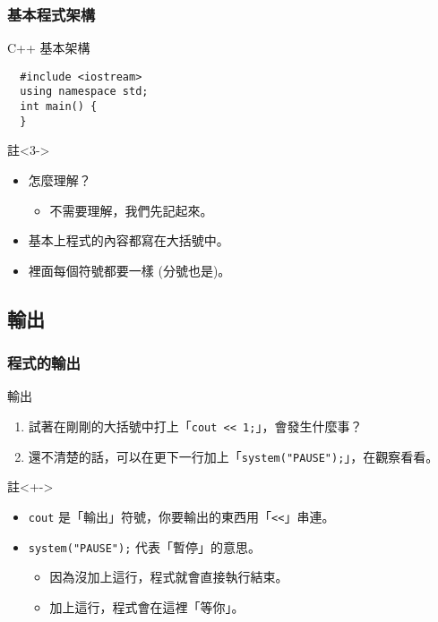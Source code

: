 \documentclass[utf8]{beamer}
\begin{document}
\begin{CJK}{UTF8}{bkai}
\begin{frame}[fragile]
  \frametitle{基本程式架構}
  \begin{block}{C++ 基本架構}
    \pause
    \begin{lstlisting}
  #include <iostream>
  using namespace std;
  int main() {
  }
    \end{lstlisting}
  \end{block}
  \begin{exampleblock}{註}<3->
    \begin{itemize}
    \item 怎麼理解？
      \begin{itemize}[<4->]
      \item 不需要理解，我們先記起來。
      \end{itemize}
    \item<5-> 基本上程式的內容都寫在\alert{大括號}中。
    \item<6-> 裡面每個符號都要一樣 (分號也是)。
    \end{itemize}
  \end{exampleblock}
\end{frame}

\subsection{輸出}

\begin{frame}[fragile]
  \frametitle{程式的輸出}
  \begin{block}{輸出}
    \begin{enumerate}[<+->]
      \item 試著在剛剛的大括號中打上「\lstinline{cout << 1;}」，會發生什麼事？
      \item 還不清楚的話，可以在更下一行加上「\lstinline{system("PAUSE");}」，在觀察看看。
    \end{enumerate}
  \end{block}
  \begin{exampleblock}{註}<+->
    \begin{itemize}
    \item \lstinline{cout} 是「輸出」符號，你要輸出的東西用「\lstinline{<<}」串連。
    \item<+-> \lstinline{system("PAUSE");} 代表「暫停」的意思。
      \begin{itemize}[<+->]
      \item 因為沒加上這行，程式就會直接執行結束。
      \item 加上這行，程式會在這裡「等你」。
      \end{itemize}
    \end{itemize}
  \end{exampleblock}
\end{frame}


\end{CJK}
\end{document}
